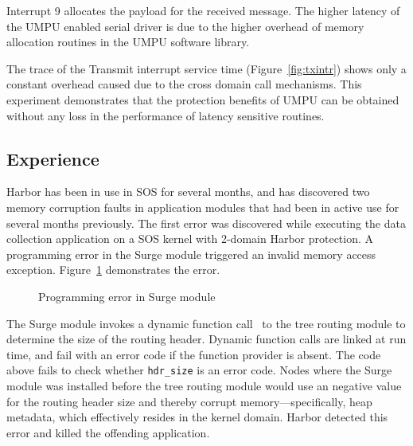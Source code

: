 Interrupt 9 allocates the payload for the received message.
%
The higher latency of the UMPU enabled serial driver is due to the
higher overhead of memory allocation routines in the UMPU software
library.
%

The trace of the Transmit interrupt service time (Figure~\ref{fig:txintr}) shows only a constant
overhead caused due to the cross domain call mechanisms.
%
This experiment demonstrates that the protection benefits of UMPU can
be obtained without any loss in the performance of latency sensitive
routines.
%
\subsection{Experience} 
%
Harbor has been in use in SOS for several months, and has
%
discovered two memory corruption faults in application modules that had
been in active use for several months previously.
%
The first error was discovered while executing the data collection
application on a SOS kernel with 2-domain Harbor protection.
%
A programming error in the Surge module triggered an invalid memory access exception.
%
Figure~\ref{fig:surge_error} demonstrates the error.

\begin{figure} [h]
  \centering
{}
  \caption{Programming error in Surge module}
  \label{fig:surge_error}
\end{figure}

\noindent
%
The Surge module invokes a dynamic function call~\cite{ram05sos} to
the tree routing module to determine the size of the routing header.
%
Dynamic function calls are linked at run time, and fail with an error
code if the function provider is absent.
%
The code above fails to check whether \verb+hdr_size+ is an error code.
%
Nodes where the Surge module was installed before the tree routing module
would use an negative value for the routing header size and thereby corrupt
memory---specifically, heap metadata, which effectively resides in the
kernel domain.
%
Harbor detected this error and killed the offending application.


